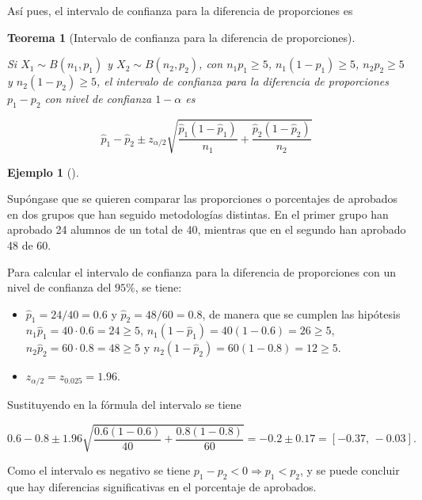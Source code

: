 \documentclass[
  spanish,
  a4paper,
]{scrreport}
\providecommand{\tightlist}{%
  \setlength{\itemsep}{0pt}\setlength{\parskip}{0pt}}
\theoremstyle{plain}
\newtheorem{theorem}{Teorema}[chapter]
\theoremstyle{definition}
\newtheorem{example}{Ejemplo}[chapter]
\theoremstyle{definition}
\theoremstyle{remark}
\begin{document}
Así pues, el intervalo de confianza para la diferencia de proporciones
es

\begin{theorem}[Intervalo de confianza para la diferencia de
proporciones]\protect\hypertarget{thm-intervalo-confianza-diferencia-proporciones}{}\label{thm-intervalo-confianza-diferencia-proporciones}

Si \(X_1\sim B(n_1,p_1)\) y \(X_2\sim B(n_2,p_2)\), con
\(n_1p_1\geq 5\), \(n_1(1-p_1)\geq 5\), \(n_2p_2\geq 5\) y
\(n_2(1-p_2)\geq 5\), el \emph{intervalo de confianza para la diferencia
de proporciones} \(p_1-p_2\) con nivel de confianza \(1-\alpha\) es

\[
\hat{p}_1-\hat{p}_2\pm z_{\alpha/2}\sqrt{\frac{\hat{p}_1(1-\hat{p}_1)}{n_1}+\frac{\hat{p}_2(1-\hat{p}_2)}{n_2}}
\]

\end{theorem}

\begin{example}[]\protect\hypertarget{exm-intervalo-confianza-diferencia-proporciones}{}\label{exm-intervalo-confianza-diferencia-proporciones}

Supóngase que se quieren comparar las proporciones o porcentajes de
aprobados en dos grupos que han seguido metodologías distintas. En el
primer grupo han aprobado 24 alumnos de un total de 40, mientras que en
el segundo han aprobado 48 de 60.

Para calcular el intervalo de confianza para la diferencia de
proporciones con un nivel de confianza del \(95\%\), se tiene:

\begin{itemize}
\tightlist
\item
  \(\hat{p}_1=24/40= 0.6\) y \(\hat{p}_2=48/60=0.8\), de manera que se
  cumplen las hipótesis \(n_1\hat{p}_1=40\cdot 0.6=24\geq 5\),
  \(n_1(1-\hat{p}_1)=40(1-0.6)=26\geq 5\),
  \(n_2\hat{p}_2=60\cdot 0.8 =48\geq 5\) y
  \(n_2(1-\hat{p}_2)=60(1-0.8)=12\geq 5\).
\item
  \(z_{\alpha/2}=z_{0.025}= 1.96\).
\end{itemize}

Sustituyendo en la fórmula del intervalo se tiene

\[
0.6-0.8\pm 1.96 \sqrt{\frac{0.6(1-0.6)}{40}+\frac{0.8(1-0.8)}{60}} = -0.2\pm 0.17 = [-0.37,\, -0.03].
\]

Como el intervalo es negativo se tiene \(p_1-p_2<0\Rightarrow p_1<p_2\),
y se puede concluir que hay diferencias significativas en el porcentaje
de aprobados.

\end{example}
\end{document}
